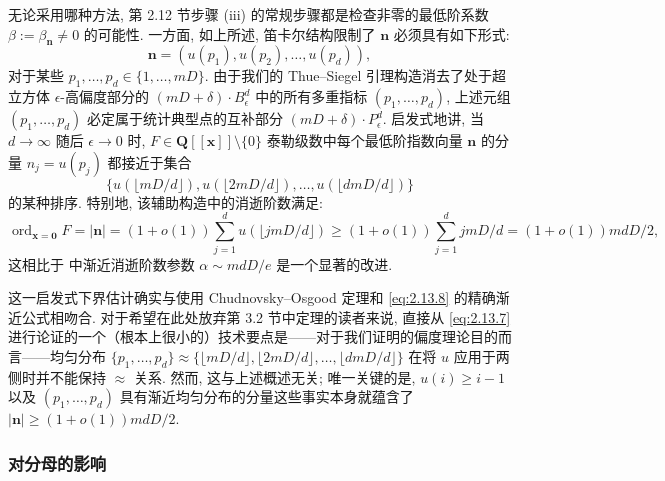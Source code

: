 无论采用哪种方法, 第 2.12 节步骤 (iii) 的常规步骤都是检查非零的最低阶系数 \(\beta := \beta_{\mathbf{n}} \neq 0\) 的可能性. 一方面, 如上所述, 笛卡尔结构限制了 \(\mathbf{n}\) 必须具有如下形式:
\[ \mathbf{n} = (u(p_1), u(p_2), \dots, u(p_d)), \]
对于某些 \(p_1, \dots, p_d \in \{1, \dots, mD\}\).
由于我们的 Thue--Siegel 引理构造消去了处于超立方体 \(\epsilon\)-高偏度部分的 \((mD+\delta)\cdot B^d_\epsilon\) 中的所有多重指标 \((p_1,\dots,p_d)\), 上述元组 \((p_1,\dots,p_d)\) 必定属于统计典型点的互补部分 \((mD+\delta)\cdot P^d_\epsilon\). 启发式地讲, 当 \(d\to\infty\) 随后 \(\epsilon\to0\) 时, \(F\in \mathbf{Q}[\![\mathbf{x}]\!]\setminus\{0\}\) 泰勒级数中每个最低阶指数向量 \(\mathbf{n}\) 的分量 \(n_j=u(p_j)\) 都接近于集合
\[ \{u(\lfloor mD/d \rfloor), u(\lfloor 2mD/d \rfloor), \dots, u(\lfloor dmD/d \rfloor)\} \]
的某种排序.
特别地, 该辅助构造中的消逝阶数满足:
\[ \operatorname{ord}_{\mathbf{x}=\mathbf{0}} F = |\mathbf{n}| = (1 + o(1)) \sum_{j=1}^{d} u(\lfloor jmD/d \rfloor) \ge (1 + o(1)) \sum_{j=1}^{d} jmD/d = (1 + o(1))mdD/2, \]
这相比于 \cite[§ 2]{CDT21} 中渐近消逝阶数参数 \(\alpha \sim mdD/e\) 是一个显著的改进.

这一启发式下界估计确实与使用 Chudnovsky--Osgood 定理和 \eqref{eq:2.13.8} 的精确渐近公式相吻合. 对于希望在此处放弃第 3.2 节中定理的读者来说, 直接从 \eqref{eq:2.13.7} 进行论证的一个（根本上很小的）技术要点是——对于我们证明的偏度理论目的而言——均匀分布 \(\{p_1,\dots,p_d\}\approx\{\lfloor mD/d\rfloor,\lfloor 2mD/d\rfloor,\dots,\lfloor dmD/d\rfloor\}\) 在将 \(u\) 应用于两侧时并不能保持 \(\approx\) 关系. 然而, 这与上述概述无关; 唯一关键的是, \(u(i)\ge i-1\) 以及 \((p_1,\dots,p_d)\) 具有渐近均匀分布的分量这些事实本身就蕴含了 \(\lvert\mathbf{n}\rvert\ge (1+o(1))mdD/2\).

\subsubsection{对分母的影响}\label{sec:2.13.9}

